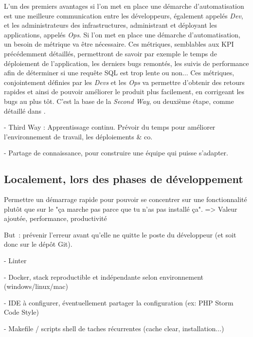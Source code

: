 L'un des premiers avantages si l'on met en place une démarche d'automatisation est une meilleure communication entre les développeurs, également appelés \emph{Dev}, et les administrateurs des infrastructures, administrant et déployant les applications, appelés \emph{Ops}. Si l'on met en place une démarche d'automatisation, un besoin de métrique va être nécessaire. Ces métriques, semblables aux \gls{KPI} précédemment détaillés, permettront de savoir par exemple le temps de déploiement de l'application, les derniers bugs remontés, les suivis de performance afin de déterminer si une requête \gls{SQL} est trop lente ou non... Ces métriques, conjointement définies par les \emph{Devs} et les \emph{Ops} va permettre d'obtenir des retours rapides et ainsi de pouvoir améliorer le produit plus facilement, en corrigeant les bugs au plus tôt. C'est la base de la \emph{Second Way}, ou deuxième étape, comme détaillé dans  \cite{phoenixProject} .


- Third Way : Apprentissage continu. Prévoir du temps pour améliorer l'environnement de travail, les déploiements  \& co.

- Partage de connaissance, pour construire une équipe qui puisse s'adapter.

\subsection{Localement, lors des phases de développement}


Permettre un démarrage rapide pour pouvoir se concentrer sur une fonctionnalité plutôt que sur le "ça marche pas parce que tu n’as pas installé ça". => Valeur ajoutée, performance, productivité

But : prévenir l'erreur avant qu'elle ne quitte le poste du développeur (et soit donc sur le dépôt Git).

-  Linter

-  Docker, stack reproductible et indépendante selon environnement (windows/linux/mac) 

- IDE à configurer, éventuellement partager la configuration (ex: PHP Storm Code Style)

-  Makefile / scripts shell de taches récurrentes (cache clear, installation...)

